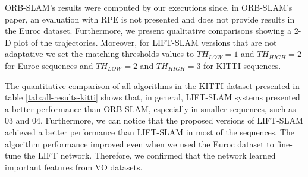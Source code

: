 ORB-SLAM's results were computed by our executions since, in ORB-SLAM's paper, an evaluation with RPE is not presented and does not provide results in the Euroc dataset. Furthermore, we present qualitative comparisons showing a 2-D plot of the trajectories. Moreover, for LIFT-SLAM versions that are not adaptative we set the matching thresholds values to $TH_{LOW} = 1$ and $TH_{HIGH} = 2$ for Euroc sequences and $TH_{LOW} = 2$ and $TH_{HIGH} = 3$ for KITTI sequences.

The quantitative comparison of all algorithms in the KITTI dataset presented in table \ref{tab:all-results-kitti} shows that, in general, LIFT-SLAM systems presented a better performance than ORB-SLAM, especially in smaller sequences, such as $03$ and $04$. Furthermore, we can notice that the proposed versions of LIFT-SLAM achieved a better performance than LIFT-SLAM in most of the sequences. The algorithm performance improved even when we used the Euroc dataset to fine-tune the LIFT network. Therefore, we confirmed that the network learned important features from VO datasets. 

